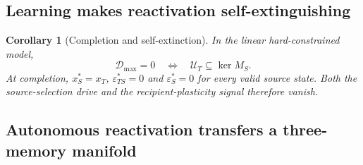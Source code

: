 \documentclass[10pt,letterpaper]{article}
\theoremstyle{plain}
\newtheorem{corollary}{Corollary}
\theoremstyle{remark}
\begin{document}

\subsection{Learning makes reactivation self-extinguishing}

\begin{corollary}[Completion and self-extinction]
\label{cor:self-extinction}
In the linear hard-constrained model,
\begin{equation}
\mathcal D_{\max}=0\quad\Longleftrightarrow\quad\mathcal U_T\subseteq\ker M_S.
\label{eq:completion}
\end{equation}
At completion, $x_S^*=x_T$, $\varepsilon_{TS}^*=0$ and $\varepsilon_S^*=0$ for every valid source state. Both the source-selection drive and the recipient-plasticity signal therefore vanish.
\end{corollary}


\subsection{Autonomous reactivation transfers a three-memory manifold}
\end{document}

